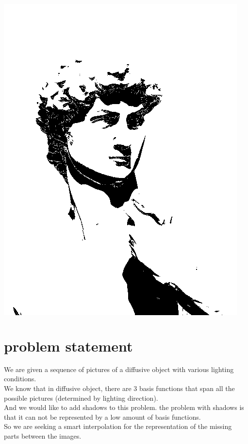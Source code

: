 \documentclass[12pt]{article}
\begin{document}
\includegraphics[scale=0.18]{e.jpg}

\section{problem statement}	
We are given a sequence of pictures of a diffusive object with various lighting conditions. \\
We know that in diffusive object, there are 3 basis functions that span all the possible pictures (determined by lighting direction). \\
And we would like to add shadows to this problem. the problem with shadows is that it can not be represented by a low amount of basis functions. \\
So we are seeking a smart interpolation for the representation of the missing parts between the images.

\newpage
\end{document}
